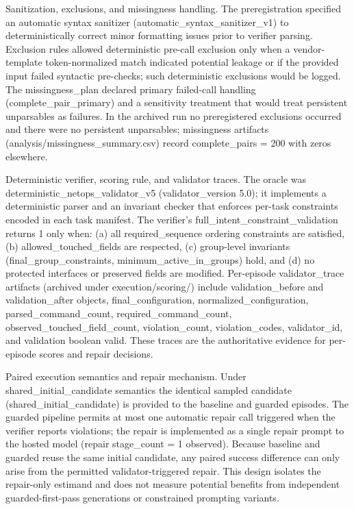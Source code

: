 \documentclass[conference]{IEEEtran}
\begin{document}
Sanitization, exclusions, and missingness handling. The preregistration specified an automatic syntax sanitizer (automatic\_syntax\_sanitizer\_v1) to deterministically correct minor formatting issues prior to verifier parsing. Exclusion rules allowed deterministic pre-call exclusion only when a vendor-template token-normalized match indicated potential leakage or if the provided input failed syntactic pre-checks; such deterministic exclusions would be logged. The missingness\_plan declared primary failed-call handling (complete\_pair\_primary) and a sensitivity treatment that would treat persistent unparsables as failures. In the archived run no preregistered exclusions occurred and there were no persistent unparsables; missingness artifacts (analysis/missingness\_summary.csv) record complete\_pairs = 200 with zeros elsewhere.

Deterministic verifier, scoring rule, and validator traces. The oracle was deterministic\_netops\_validator\_v5 (validator\_version 5.0); it implements a deterministic parser and an invariant checker that enforces per-task constraints encoded in each task manifest. The verifier's full\_intent\_constraint\_validation returns 1 only when: (a) all required\_sequence ordering constraints are satisfied, (b) allowed\_touched\_fields are respected, (c) group-level invariants (final\_group\_constraints, minimum\_active\_in\_groups) hold, and (d) no protected interfaces or preserved fields are modified. Per-episode validator\_trace artifacts (archived under execution/scoring/) include validation\_before and validation\_after objects, final\_configuration, normalized\_configuration, parsed\_command\_count, required\_command\_count, observed\_touched\_field\_count, violation\_count, violation\_codes, validator\_id, and validation boolean valid. These traces are the authoritative evidence for per-episode scores and repair decisions.

Paired execution semantics and repair mechanism. Under shared\_initial\_candidate semantics the identical sampled candidate (shared\_initial\_candidate) is provided to the baseline and guarded episodes. The guarded pipeline permits at most one automatic repair call triggered when the verifier reports violations; the repair is implemented as a single repair prompt to the hosted model (repair stage\_count = 1 observed). Because baseline and guarded reuse the same initial candidate, any paired success difference can only arise from the permitted validator-triggered repair. This design isolates the repair-only estimand and does not measure potential benefits from independent guarded-first-pass generations or constrained prompting variants.
\end{document}
